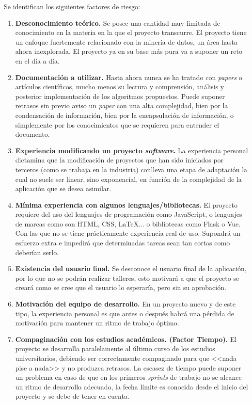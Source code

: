 Se identifican los siguientes factores de riesgo:
\begin{enumerate}
\item \textbf{Desconocimiento teórico.} Se posee una cantidad muy limitada de conocimiento en la materia en la que el proyecto transcurre. El proyecto tiene un enfoque fuertemente relacionado con la minería de datos, un área hasta ahora inexplorada. El proyecto ya en su base más pura va a suponer un reto en el día a día.
\item \textbf{Documentación a utilizar.} Hasta ahora nunca se ha tratado con \textit{papers} o artículos científicos, mucho menos su lectura y comprensión, análisis y posterior implementación de los algoritmos propuestos. Puede suponer retrasos sin previo aviso un \textit{paper} con una alta complejidad, bien por la condensación de información, bien por la encapsulación de información, o simplemente por los conocimientos que se  requieren para entender el documento.
\item \textbf{Experiencia modificando un proyecto \textit{software}.} La experiencia personal dictamina que la modificación de proyectos que han sido iniciados por terceros (como se trabaja en la industria) conlleva una etapa de adaptación la cual no suele ser linear, sino exponencial, en función de la complejidad de la aplicación que se desea asimilar.
\item \textbf{Mínima experiencia con algunos lenguajes/bibliotecas.} El proyecto requiere del uso del lenguajes de programación como JavaScript, o lenguajes de marcas como son HTML, CSS, \LaTeX ... o bibliotecas como Flask o Vue. Con las que no se tiene prácticamente experiencia real de uso. Supondrá un esfuerzo extra e impedirá que determinadas tareas sean tan cortas como deberían serlo.
\item \textbf{Existencia del usuario final.} Se desconoce el usuario final de la aplicación, por lo que no se podrán realizar talleres, esto motivará a que el proyecto se creará como se cree que el usuario lo esperaría, pero sin su aprobación.
\item \textbf{Motivación del equipo de desarrollo.} En un proyecto nuevo y de este tipo, la experiencia personal es que antes o después habrá una pérdida de motivación para mantener un ritmo de trabajo óptimo.
\item \textbf{Compaginación con los estudios académicos. (Factor Tiempo).} El proyecto se desarrolla paralelamente al último curso de los estudios universitarios, debiendo ser correctamente compaginado para que <<nada pise a nada>> y no produzca retrasos. La escasez de tiempo puede suponer un problema en caso de que en los primeros \textit{sprints} de trabajo no se alcance un ritmo de desarrollo adecuado, la fecha límite es conocida desde el inicio del proyecto y se debe de tener en cuenta.

\end{enumerate}
